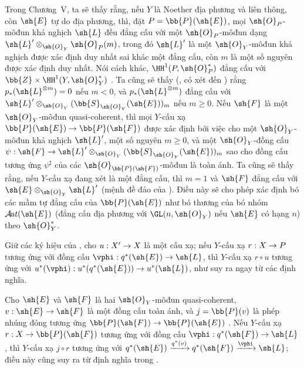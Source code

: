 \documentclass[oneside,10pt]{amsart}
\makeatletter
\renewcommand{\geq}{\geqslant}
\newcommand{\ega@arrow}[2]{\mathchoice{#1}{#2}{#2}{#2}}
\renewcommand{\to}{\ega@arrow{\longrightarrow}{\rightarrow}}
\def\shAut{\mathcal{A}\!\mathit{ut}}
\newcommand{\oldpage}[2][]{\marginnote{\normalfont\footnotesize\textbf{#1}~|~#2}\ignorespaces}
\let\EGAOriginalLabel\label
\renewcommand{\label}[1]{\phantomsection\EGAOriginalLabel{#1}}
\makeatother
\begin{document}
\begin{remark}[4.2.7]
\label{II.4.2.7}
Trong Chương~V, ta sẽ thấy rằng, nếu $Y$ là Noether địa phương và liên thông, còn $\sh{E}$ tự do địa phương, thì, đặt $P=\bb{P}(\sh{E})$, mọi $\sh{O}_P$-môđun khả nghịch $\sh{L}$ đều đẳng cấu với một $\sh{O}_P$-môđun dạng $\sh{L}'\otimes_{\sh{O}_Y}\sh{O}_P(m)$, trong đó $\sh{L}'$ là một $\sh{O}_Y$-môđun khả nghịch được xác định duy nhất sai khác một đẳng cấu, còn $m$ là một số nguyên được xác định duy nhất.
Nói cách khác, $\HH^1(P,\sh{O}_P^*)$ đẳng cấu với $\bb{Z}\times\HH^1(Y,\sh{O}_Y^*)$ .
Ta cũng sẽ thấy (, có xét đến ) rằng $p_*(\sh{L}^{\otimes m})=0$ nếu $m<0$, và $p_*(\sh{L}^{\otimes m})$ đẳng cấu với $\sh{L}'\otimes_{\sh{O}_Y}(\bb{S}_{\sh{O}_Y}(\sh{E}))_m$ nếu $m\geq0$.
Nếu $\sh{F}$ là một $\sh{O}_Y$-môđun quasi-coherent, thì mọi $Y$-cấu xạ $\bb{P}(\sh{E})\to\bb{P}(\sh{F})$ được xác định bởi việc cho một $\sh{O}_Y$-môđun khả nghịch $\sh{L}'$, một số nguyên $m\geq0$, và một $\sh{O}_Y$-đồng cấu $\psi:\sh{F}\to\sh{L}'\otimes_{\sh{O}_Y}(\bb{S}_{\sh{O}_Y}(\sh{E}))_m$ sao cho đồng cấu tương ứng $\psi^\sharp$ của các $\sh{O}_{\bb{P}(\sh{F})}$-môđun là toàn ánh.
Ta cũng sẽ thấy rằng, nếu $Y$-cấu xạ đang xét là một đẳng cấu, thì $m=1$ và $\sh{F}$ đẳng cấu với $\sh{E}\otimes_{\sh{O}_Y}\sh{L}'$ (mệnh đề đảo của ).
Điều này sẽ cho phép xác định bó các mầm tự đẳng cấu của $\bb{P}(\sh{E})$ như bó thương của bó nhóm $\shAut(\sh{E})$ (đẳng cấu địa phương với $\GL(n,\sh{O}_Y)$ nếu $\sh{E}$ có hạng $n$) theo $\sh{O}_Y^*$.
\end{remark}

\begin{env}[4.2.8]
\label{II.4.2.8}
Giữ các ký hiệu của , cho $u:X'\to X$ là một cấu xạ;
nếu $Y$-cấu xạ $r:X\to P$ tương ứng với đồng cấu $\vphi:q^*(\sh{E})\to\sh{L}$, thì $Y$-cấu xạ $r\circ u$ tương ứng với $u^*(\vphi):u^*(q^*(\sh{E}))\to u^*(\sh{L})$, như suy ra ngay từ các định nghĩa.
\end{env}

\begin{env}[4.2.9]
\label{II.4.2.9}
Cho $\sh{E}$ và $\sh{F}$ là hai $\sh{O}_Y$-môđun quasi-coherent, $v:\sh{E}\to\sh{F}$ là một đồng cấu toàn ánh, và $j=\bb{P}(v)$ là phép nhúng đóng tương ứng $\bb{P}(\sh{F})\to\bb{P}(\sh{E})$ .
Nếu $Y$-cấu xạ $r:X\to\bb{P}(\sh{F})$ tương ứng với đồng cấu $\vphi:q^*(\sh{F})\to\sh{L}$, thì
\oldpage[II]{76}
$Y$-cấu xạ $j\circ r$ tương ứng với $q^*(\sh{E})\xrightarrow{q^*(v)}q^*(\sh{F})\xrightarrow{\vphi}\sh{L}$;
điều này cũng suy ra từ định nghĩa trong .
\end{env}
\end{document}
